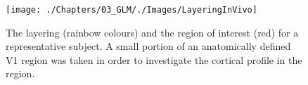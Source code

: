 \begin{figure}[ht]
\centering
\texttt{[image: ./Chapters/03\_GLM/./Images/LayeringInVivo]}
\caption{The layering (rainbow colours) and the region of interest (red) for a representative subject. A small portion of an anatomically defined V1 region was taken in order to investigate the cortical profile in the region.}
\label{fig:invivovolume}
\end{figure}